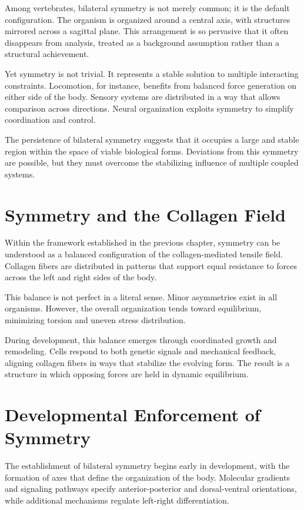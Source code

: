 \documentclass[11pt,oneside]{book}
\begin{document}
Among vertebrates, bilateral symmetry is not merely common; it is the default configuration. The organism is organized around a central axis, with structures mirrored across a sagittal plane. This arrangement is so pervasive that it often disappears from analysis, treated as a background assumption rather than a structural achievement.

Yet symmetry is not trivial. It represents a stable solution to multiple interacting constraints. Locomotion, for instance, benefits from balanced force generation on either side of the body. Sensory systems are distributed in a way that allows comparison across directions. Neural organization exploits symmetry to simplify coordination and control.

The persistence of bilateral symmetry suggests that it occupies a large and stable region within the space of viable biological forms. Deviations from this symmetry are possible, but they must overcome the stabilizing influence of multiple coupled systems.

\section{Symmetry and the Collagen Field}

Within the framework established in the previous chapter, symmetry can be understood as a balanced configuration of the collagen-mediated tensile field. Collagen fibers are distributed in patterns that support equal resistance to forces across the left and right sides of the body.

This balance is not perfect in a literal sense. Minor asymmetries exist in all organisms. However, the overall organization tends toward equilibrium, minimizing torsion and uneven stress distribution.

During development, this balance emerges through coordinated growth and remodeling. Cells respond to both genetic signals and mechanical feedback, aligning collagen fibers in ways that stabilize the evolving form. The result is a structure in which opposing forces are held in dynamic equilibrium.

\section{Developmental Enforcement of Symmetry}

The establishment of bilateral symmetry begins early in development, with the formation of axes that define the organization of the body. Molecular gradients and signaling pathways specify anterior-posterior and dorsal-ventral orientations, while additional mechanisms regulate left-right differentiation.
\end{document}
